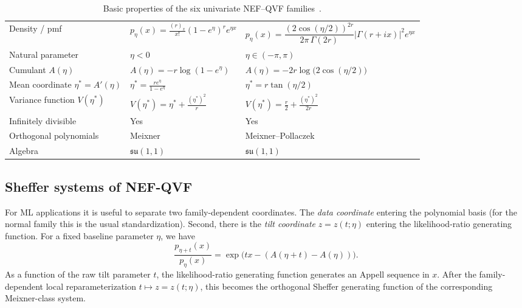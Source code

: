 \documentclass[a4paper,11pt]{article}
\numberwithin{equation}{section}
\theoremstyle{plain}
\theoremstyle{definition}
\theoremstyle{remark}
\newcommand{\1}{\ensuremath{\mathds{1}}\xspace}
\begin{document}
\begin{table}[p]
\begin{tabularx}{\linewidth}{lXX}
Density / pmf
& $p_\eta(x)=\frac{(r)_x}{x!}(1-e^\eta)^r e^{\eta x}$
& $p_\eta(x)=\dfrac{(2\cos(\eta/2))^{2r}}{2\pi\,\Gamma(2r)}\left|\Gamma(r+i x)\right|^2 e^{\eta x}$
\\[3pt]

Natural parameter
& $\eta<0$
& $\eta\in(-\pi,\pi)$
\\[3pt]

Cumulant $A(\eta)$
& $A(\eta)=-r\log(1-e^\eta)$
& $A(\eta)=-2r\log\!\big(2\cos(\eta/2)\big)$
\\[3pt]

Mean coordinate $\eta^\ast=A'(\eta)$
& $\eta^\ast=\frac{r e^\eta}{1-e^\eta}$
& $\eta^\ast=r\tan(\eta/2)$
\\[3pt]

Variance function $V(\eta^\ast)$
& $V(\eta^\ast)=\eta^\ast+\frac{(\eta^\ast)^2}{r}$
& $V(\eta^\ast)=\frac{r}{2}+\frac{(\eta^\ast)^2}{2r}$
\\[3pt]

Infinitely divisible
& Yes
& Yes
\\[3pt]

Orthogonal polynomials
& Meixner
& Meixner--Pollaczek
\\[3pt]

Algebra
& $\mathfrak{su}(1,1)$
& $\mathfrak{su}(1,1)$
\\

\bottomrule
\end{tabularx}

\caption{Basic properties of the six univariate NEF--QVF families~\cite{Morris82}.}
\end{table}

\subsection{Sheffer systems of NEF-QVF}\label{sec:NEF-QVF-Sheffer}
For ML applications it is useful to separate two family-dependent coordinates.
The \emph{data coordinate} entering the polynomial basis
(for the normal family this is the usual standardization).
Second, there is the \emph{tilt coordinate} \(z=z(t;\eta)\) entering the
likelihood-ratio generating function.
For a fixed baseline parameter \(\eta\), we have
\[
\frac{p_{\eta+t}(x)}{p_\eta(x)}
=\exp\!\big(tx-(A(\eta+t)-A(\eta))\big).
\]
As a function of the raw tilt parameter \(t\), the likelihood-ratio generating function generates an
Appell sequence in \(x\). After the family-dependent local reparameterization
\(t\mapsto z=z(t;\eta)\), this becomes the orthogonal Sheffer generating function
of the corresponding Meixner-class system.
\end{document}
